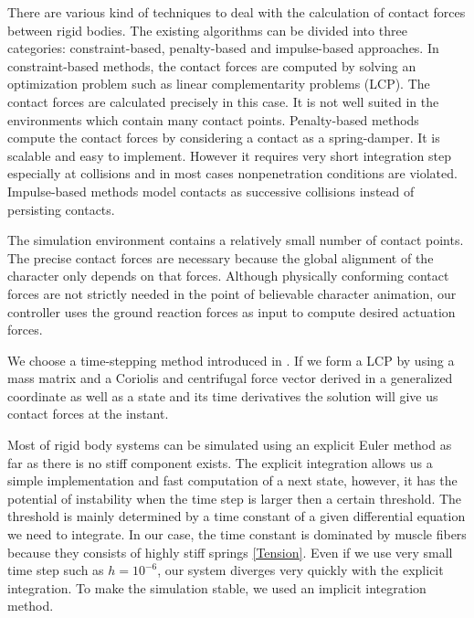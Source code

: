 \documentclass[a4paper,10pt]{article}
\begin{document}

There are various kind of techniques to deal with the calculation of
contact forces between rigid bodies. The existing algorithms can be
divided into three categories: constraint-based, penalty-based and
impulse-based approaches. In constraint-based methods, the contact
forces are computed by solving an optimization problem such as
linear complementarity problems (LCP). The contact forces are calculated
precisely in this case. It is not well suited in the environments
which contain many contact points. Penalty-based methods compute
the contact forces by considering a contact as a spring-damper.
It is scalable and easy to implement. However it requires very short
integration step especially at collisions and in most cases nonpenetration
conditions are violated. Impulse-based methods model contacts
as successive collisions instead of persisting contacts.

The simulation environment contains a relatively small number
of contact points. The precise contact forces are necessary because
the global alignment of the character only depends on that forces.
Although physically conforming contact forces are not strictly needed in
the point of believable character animation, our controller uses the
ground reaction forces as input to compute desired actuation forces.

We choose a time-stepping method introduced in \cite{StewartT00, oai:CiteSeerPSU:258685}.
If we form a LCP by using a mass matrix and a Coriolis and centrifugal force vector
derived in a generalized coordinate as well as a state and its time derivatives
the solution will give us contact forces at the instant.



Most of rigid body systems can be simulated using an explicit Euler method
as far as there is no stiff component exists. The explicit integration
allows us a simple implementation and fast computation of a next state,
however, it has the potential of instability when the time step is larger
then a certain threshold. The threshold is mainly determined by a time
constant of a given differential equation we need to integrate. In our case, the time
constant is dominated by muscle fibers because they consists
of highly stiff springs \eqref{Tension}. Even if we use very small time step
such as $h=10^{-6}$, our system diverges very quickly with the explicit
integration. To make the simulation stable, we used an implicit integration
method.
\end{document}
